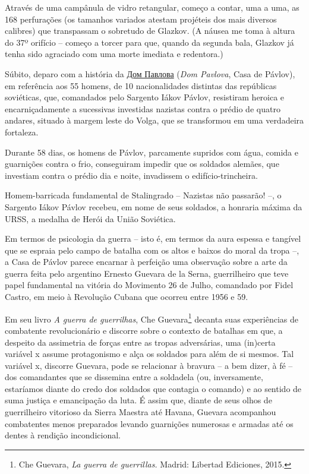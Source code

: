 Através de uma campânula de vidro retangular, começo a contar, uma a
uma, as 168 perfurações (os tamanhos variados atestam projéteis dos mais
diversos calibres) que transpassam o sobretudo de Glazkov. (A náusea me
toma à altura do 37º orifício -- começo a torcer para que, quando da
segunda bala, Glazkov já tenha sido agraciado com uma morte imediata e
redentora.)

Súbito, deparo com a história da
\href{https://ru.wikipedia.org/wiki/\%D0\%94\%D0\%BE\%D0\%BC_\%D0\%9F\%D0\%B0\%D0\%B2\%D0\%BB\%D0\%BE\%D0\%B2\%D0\%B0}{Дом
Павлова} (\emph{Dom Pavlova}, Casa de Pávlov), em referência aos 55
homens, de 10 nacionalidades distintas das repúblicas soviéticas, que,
comandados pelo Sargento Iákov Pávlov, resistiram heroica e
encarniçadamente a sucessivas investidas nazistas contra o prédio de
quatro andares, situado à margem leste do Volga, que se transformou em
uma verdadeira fortaleza.

Durante 58 dias, os homens de Pávlov, parcamente supridos com água,
comida e guarnições contra o frio, conseguiram impedir que os soldados
alemães, que investiam contra o prédio dia e noite, invadissem o
edifício-trincheira.

Homem-barricada fundamental de Stalingrado -- Nazistas não passarão! --,
o Sargento Iákov Pávlov recebeu, em nome de seus soldados, a honraria
máxima da URSS, a medalha de Herói da União Soviética.

Em termos de psicologia da guerra -- isto é, em termos da aura espessa e
tangível que se espraia pelo campo de batalha com os altos e baixos do
moral da tropa --, a Casa de Pávlov parece encarnar à perfeição uma
observação sobre a arte da guerra feita pelo argentino Ernesto Guevara
de la Serna, guerrilheiro que teve papel fundamental na vitória do
Movimento 26 de Julho, comandado por Fidel Castro, em meio à Revolução
Cubana que ocorreu entre 1956 e 59.

Em seu livro \emph{A guerra de guerrilhas}, Che Guevara\footnote{Che
  Guevara, \emph{La guerra de guerrillas.} Madrid: Libertad Ediciones,
  2015.} decanta suas experiências de combatente revolucionário e
discorre sobre o contexto de batalhas em que, a despeito da assimetria
de forças entre as tropas adversárias, uma (in)certa variável x assume
protagonismo e alça os soldados para além de si mesmos. Tal variável x,
discorre Guevara, pode se relacionar à bravura -- a bem dizer, à fé --
dos comandantes que se dissemina entre a soldadela (ou, inversamente,
estaríamos diante do credo dos soldados que contagia o comando) e ao
sentido de suma justiça e emancipação da luta. É assim que, diante de
seus olhos de guerrilheiro vitorioso da Sierra Maestra até Havana,
Guevara acompanhou combatentes menos preparados levando guarnições
numerosas e armadas até os dentes à rendição incondicional.

